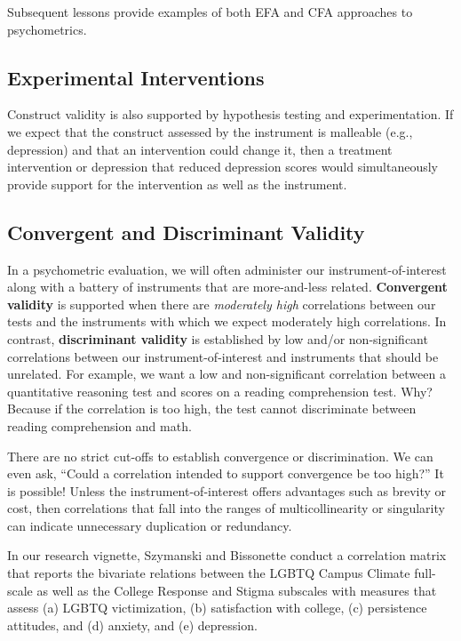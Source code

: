 \documentclass[
  english,
]{book}
\begin{document}
Subsequent lessons provide examples of both EFA and CFA approaches to psychometrics.

\hypertarget{experimental-interventions}{%
\subsection{Experimental Interventions}\label{experimental-interventions}}

Construct validity is also supported by hypothesis testing and experimentation. If we expect that the construct assessed by the instrument is malleable (e.g., depression) and that an intervention could change it, then a treatment intervention or depression that reduced depression scores would simultaneously provide support for the intervention as well as the instrument.

\hypertarget{convergent-and-discriminant-validity}{%
\subsection{Convergent and Discriminant Validity}\label{convergent-and-discriminant-validity}}

In a psychometric evaluation, we will often administer our instrument-of-interest along with a battery of instruments that are more-and-less related. \textbf{Convergent validity} is supported when there are \emph{moderately high} correlations between our tests and the instruments with which we expect moderately high correlations. In contrast, \textbf{discriminant validity} is established by low and/or non-significant correlations between our instrument-of-interest and instruments that should be unrelated. For example, we want a low and non-significant correlation between a quantitative reasoning test and scores on a reading comprehension test. Why? Because if the correlation is too high, the test cannot discriminate between reading comprehension and math.

There are no strict cut-offs to establish convergence or discrimination. We can even ask, ``Could a correlation intended to support convergence be too high?'' It is possible! Unless the instrument-of-interest offers advantages such as brevity or cost, then correlations that fall into the ranges of multicollinearity or singularity can indicate unnecessary duplication or redundancy.

In our research vignette, Szymanski and Bissonette \citeyearpar{szymanski_perceptions_2020} conduct a correlation matrix that reports the bivariate relations between the LGBTQ Campus Climate full-scale as well as the College Response and Stigma subscales with measures that assess (a) LGBTQ victimization, (b) satisfaction with college, (c) persistence attitudes, and (d) anxiety, and (e) depression.
\end{document}
